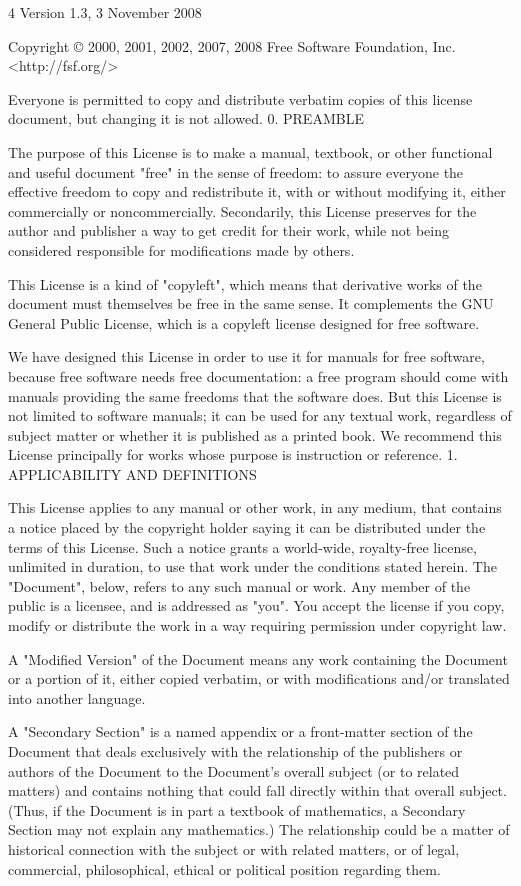 \documentclass[fontsize=11pt,paper=A4,BCOR=12mm,DIV=13,open=any,listof=totoc,toc=flat]{scrbook}
\begin{document}
{\begin{multicols}{4}
Version 1.3, 3 November 2008

Copyright © 2000, 2001, 2002, 2007, 2008 Free Software Foundation, Inc. <http://fsf.org/>

Everyone is permitted to copy and distribute verbatim copies of this license document, but changing it is not allowed.
0. PREAMBLE

The purpose of this License is to make a manual, textbook, or other functional and useful document "free" in the sense of freedom: to assure everyone the effective freedom to copy and redistribute it, with or without modifying it, either commercially or noncommercially. Secondarily, this License preserves for the author and publisher a way to get credit for their work, while not being considered responsible for modifications made by others.

This License is a kind of "copyleft", which means that derivative works of the document must themselves be free in the same sense. It complements the GNU General Public License, which is a copyleft license designed for free software.

We have designed this License in order to use it for manuals for free software, because free software needs free documentation: a free program should come with manuals providing the same freedoms that the software does. But this License is not limited to software manuals; it can be used for any textual work, regardless of subject matter or whether it is published as a printed book. We recommend this License principally for works whose purpose is instruction or reference.
1. APPLICABILITY AND DEFINITIONS

This License applies to any manual or other work, in any medium, that contains a notice placed by the copyright holder saying it can be distributed under the terms of this License. Such a notice grants a world-wide, royalty-free license, unlimited in duration, to use that work under the conditions stated herein. The "Document", below, refers to any such manual or work. Any member of the public is a licensee, and is addressed as "you". You accept the license if you copy, modify or distribute the work in a way requiring permission under copyright law.

A "Modified Version" of the Document means any work containing the Document or a portion of it, either copied verbatim, or with modifications and/or translated into another language.

A "Secondary Section" is a named appendix or a front-matter section of the Document that deals exclusively with the relationship of the publishers or authors of the Document to the Document's overall subject (or to related matters) and contains nothing that could fall directly within that overall subject. (Thus, if the Document is in part a textbook of mathematics, a Secondary Section may not explain any mathematics.) The relationship could be a matter of historical connection with the subject or with related matters, or of legal, commercial, philosophical, ethical or political position regarding them.


\end{multicols}}
\end{document}
